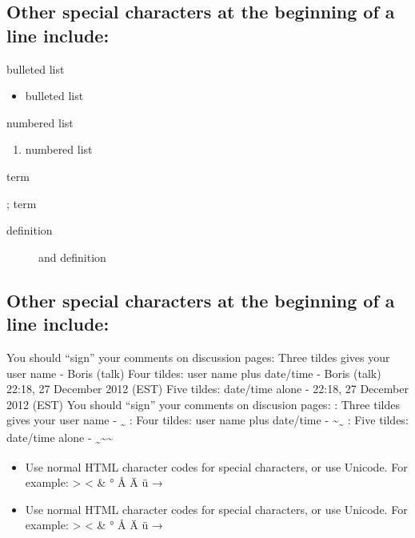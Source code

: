 \documentclass[]{book}
\providecommand{\tightlist}{%
  \setlength{\itemsep}{0pt}\setlength{\parskip}{0pt}}
\begin{document}
\subsection{Other special characters at the beginning of a line
include:}\label{other-special-characters-at-the-beginning-of-a-line-include}

bulleted list

\begin{itemize}
\tightlist
\item
  bulleted list
\end{itemize}

numbered list

\begin{enumerate}
\def\labelenumi{\arabic{enumi}.}
\tightlist
\item
  numbered list
\end{enumerate}

term

; term

\begin{description}
\item[definition]
and definition
\end{description}

\subsection{Other special characters at the beginning of a line
include:}\label{other-special-characters-at-the-beginning-of-a-line-include-1}

You should ``sign'' your comments on discussion pages: Three tildes
gives your user name - Boris (talk) Four tildes: user name plus
date/time - Boris (talk) 22:18, 27 December 2012 (EST) Five tildes:
date/time alone - 22:18, 27 December 2012 (EST) You should ``sign'' your
comments on discusion pages: : Three tildes gives your user name -
\textsubscript{\textasciitilde{}} : Four tildes: user name plus
date/time - \textasciitilde{}\textsubscript{\textasciitilde{}} : Five
tildes: date/time alone -
\textsubscript{\textasciitilde{}}\textasciitilde{}\textasciitilde{}

\begin{itemize}
\tightlist
\item
  Use normal HTML character codes for special characters, or use
  Unicode. For example: \textgreater{} \textless{} \& ° Å Ä ü →
\item
  Use normal HTML character codes for special characters, or use
  Unicode. For example: \textgreater{} \textless{} \& ° Å Ä ü →
\end{itemize}
\end{document}
